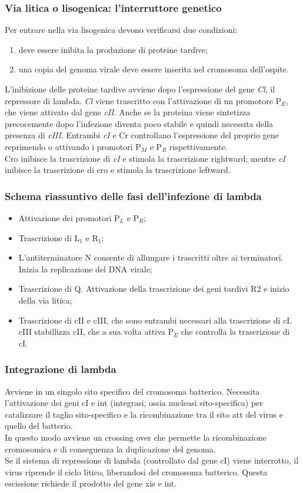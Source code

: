 \subsubsection{Via litica o lisogenica: l'interruttore genetico}
Per entrare nella via lisogenica devono verificarsi due condizioni:
\begin{enumerate}
    \item deve essere inibita la produzione di proteine tardive;
    \item una copia del genoma virale deve essere inserita nel cromosoma dell'ospite.
\end{enumerate}
L'inibizione delle proteine tardive avviene dopo l'espressione del gene \textit{Cl}, il repressore di lambda. \textit{Cl} viene trascritto con l'attivazione di un promotore P$_E$, che viene attivato dal gene \textit{cII}. Anche se la proteina viene sintetizza precocemente dopo l'infezione diventa poco stabile e quindi necessita della presenza di \textit{cIII}.
Entrambi \textit{cI} e Cr controllano l'espressione del proprio gene reprimendo o attivando i promotori P$_M$ e P$_R$ rispettivamente. 
\\Cro inibisce la trascrizione di \textit{cI} e stimola la trascrizione rightward; mentre \textit{cI} inibisce la trascrizione di cro e stimola la trascrizione leftward. 
\subsubsection{Schema riassuntivo delle fasi dell'infezione di lambda}
\begin{itemize}
    \item Attivazione dei promotori P$_L$ e P$_R$;
    \item Trascrizione di L$_1$ e R$_1$; 
    \item L'antiterminatore N consente di allungare i trascritti oltre ai terminatori. Inizia la replicazione del DNA virale;
    \item Trascrizione di Q. Attivazione della trascrizione dei geni tardivi R2 e inizio della via litica; 
    \item Trascrizione di cII e cIII, che sono entrambi necessari alla trascrizione di cI. cIII stabillizza cII, che a sua volta attiva P$_E$ che controlla la trascrizione di cI. 
\end{itemize}
\subsubsection{Integrazione di lambda}
Avviene in un singolo sito specifico del cromosoma batterico. Necessita l'attivazione dei geni cI e int (integrasi, ossia nucleasi sito-specifica) per catalizzare il taglio sito-specifico e la ricombinazione tra il sito att del virus e quello del batterio. 
\\In questo modo avviene un crossing over che permette la ricombinazione cromosomica e di conseguenza la duplicazione del genoma. 
\\Se il sistema di repressione di lambda (controllato dal gene cI) viene interrotto, il virus riprende il ciclo litico, liberandosi del cromosoma batterico. Questa escissione richiede il prodotto del gene xis e int. 
